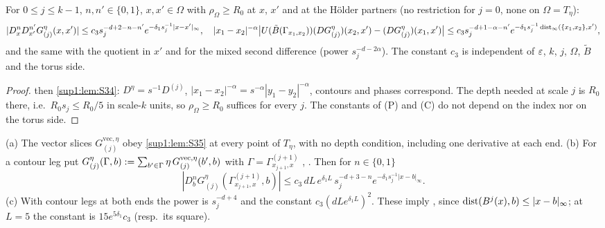 \begin{lemma}\label{sup1:lem:S35}
For $0\le j\le k-1$, $n,n'\in\{0,1\}$, $x,x'\in\Omega$ with $\rho_\Omega\ge R_0$ at $x$, $x'$ and at the H\"older partners (no restriction for $j=0$, none on $\Omega=T_\eta$):
\[
|D^n_xD^{n'}_{x'}G^\eta_{(j)}(x,x')|\le c_3s_j^{-d+2-n-n'}e^{-\delta_1s_j^{-1}|x-x'|_\infty},\quad
|x_1-x_2|^{-\alpha}\big|U(\tilde B(\Gamma_{x_1,x_2}))(DG^\eta_{(j)})(x_2,x')-(DG^\eta_{(j)})(x_1,x')\big|\le c_3s_j^{-d+1-\alpha-n'}e^{-\delta_1s_j^{-1}\operatorname{dist}_\infty(\{x_1,x_2\},x')},
\]
and the same with the quotient in $x'$ and for the mixed second difference (power $s_j^{-d-2\alpha}$). The constant $c_3$ is independent of $\varepsilon$, $k$, $j$, $\Omega$, $\tilde B$ and the torus side.
\end{lemma}

\begin{proof}
 then \cref{sup1:lem:S34}: $D^\eta=s^{-1}D^{(j)}$, $|x_1-x_2|^{-\alpha}=s^{-\alpha}|y_1-y_2|^{-\alpha}$, contours and phases correspond. The depth needed at scale $j$ is $R_0$ there, i.e.\ $R_0s_j\le R_0/5$ in scale-$k$ units, so $\rho_\Omega\ge R_0$ suffices for every $j$. The constants of (P) and (C) do not depend on the index nor on the torus side.
\end{proof}

\begin{lemma}\label{sup1:lem:S36}
\textup{(a)} The vector slices $G^{\mathrm{vec},\eta}_{(j)}$ obey \cref{sup1:lem:S35} at every point of $T_\eta$, with no depth condition, including one derivative at each end. \textup{(b)} For a contour leg put $G^\eta_{(j)}(\Gamma,b):=\sum_{b'\in\Gamma}\eta\,G^{\mathrm{vec},\eta}_{(j)}(b',b)$ with $\Gamma=\Gamma^{(j+1)}_{x_{j+1},x}$ \cite[(2.2)]{Ba1}, \cite[(1.3)]{Ba3}. Then for $n\in\{0,1\}$
\[
|D^n_bG^\eta_{(j)}(\Gamma^{(j+1)}_{x_{j+1},x},b)|\le c_3\,dL\,e^{\delta_1L}\,s_j^{-d+3-n}e^{-\delta_1s_j^{-1}|x-b|_\infty}.
\]
\textup{(c)} With contour legs at both ends the power is $s_j^{-d+4}$ and the constant $c_3(dLe^{\delta_1L})^2$. These imply \cite[(2.12)]{Ba3}, since $\operatorname{dist}(B^j(x),b)\le|x-b|_\infty$; at $L=5$ the constant is $15e^{5\delta_1}c_3$ (resp.\ its square).
\end{lemma}

